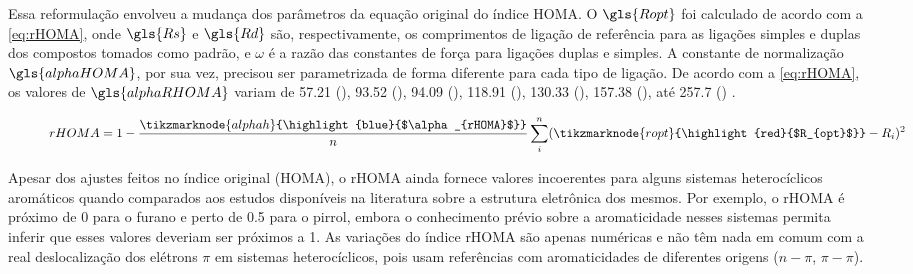 Essa reformulação envolveu a mudança dos parâmetros da equação original do índice \gls{HOMA}. O $\gls{Ropt}$ foi calculado de acordo com a \autoref{eq:rHOMA}, onde $\gls{Rs}$ e $\gls{Rd}$ são, respectivamente, os comprimentos de ligação de referência para as ligações simples e duplas dos compostos tomados como padrão, e $\omega$ é a razão das constantes de força para ligações duplas e simples. A constante de normalização $\gls{alphaHOMA}$, por sua vez, precisou ser parametrizada de forma diferente para cada tipo de ligação. De acordo com a \autoref{eq:rHOMA}, os valores de $\gls{alphaRHOMA}$ variam de 57.21 (), 93.52 (), 94.09 (), 118.91 (), 130.33 (), 157.38 (), até 257.7 () \autocite{Krygowski2000, krygowski2001}.


\begin{figure}[htb]
    \vspace{3\baselineskip}
\begin{equation}
    \label{eq:rHOMA}
    rHOMA = 1 - \frac{\tikzmarknode{alphah}{\highlight{blue}{$\alpha_{rHOMA}$}}}{n} \sum_i^n (\tikzmarknode{ropt}{\highlight{red}{$R_{opt}$}} - R_i)^2
\end{equation}
\vspace{2\baselineskip}
\end{figure}

Apesar dos ajustes feitos no índice original (\gls{HOMA}), o \gls{rHOMA} ainda fornece valores incoerentes para alguns sistemas heterocíclicos aromáticos quando comparados aos estudos disponíveis na literatura sobre a estrutura eletrônica dos mesmos. Por exemplo, o \gls{rHOMA} é próximo de 0 para o furano e perto de 0.5 para o pirrol, embora o conhecimento prévio sobre a aromaticidade nesses sistemas permita inferir que esses valores deveriam ser próximos a 1. As variações do índice \gls{rHOMA} são
apenas numéricas e não têm nada em comum com a real deslocalização dos elétrons $\pi$ em sistemas heterocíclicos, pois usam referências com aromaticidades de diferentes origens ($n-\pi$, $\pi-\pi$).

